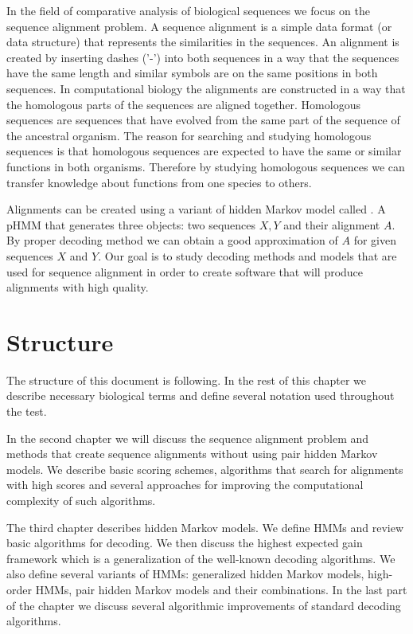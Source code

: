 In the field of comparative analysis of biological sequences we focus on the
sequence alignment problem. A sequence alignment is a simple data format (or data
structure) that represents the similarities in the sequences. An alignment is
created by inserting dashes ('-') into both sequences in a way that the
sequences have the same
length and similar symbols are on the same positions in both sequences. In
computational biology the alignments are constructed in a way that the
homologous parts of the sequences are aligned together. Homologous sequences are sequences that have evolved
from the same part of the sequence of the ancestral organism.
The reason for searching and studying homologous sequences is that homologous
sequences are expected to have the same or similar functions in both organisms.
Therefore by studying homologous sequences we can transfer knowledge about
functions from one species to others.

Alignments can be created using a variant of hidden Markov model called
. A pHMM  that generates three
objects: two sequences $X,Y$ and their alignment $A$.  By proper decoding method
we can obtain a good approximation of $A$ for given sequences $X$ and $Y$. Our
goal is to study decoding methods and models that are used for sequence
alignment in order to create software that will produce alignments with high
quality.

\section{Structure}

The structure of this document is following. In the rest of this chapter we describe
necessary biological terms and define several
notation used throughout the test.

In the second chapter we will discuss the sequence alignment problem and methods
that create sequence alignments without using pair hidden Markov
models. We describe basic scoring schemes, algorithms that search for alignments
with high scores and several approaches for improving the computational
complexity of such algorithms.

The third chapter describes hidden Markov models. We define HMMs and review basic
algorithms for decoding. We then discuss the highest expected gain
framework which is a generalization of the well-known decoding algorithms. 
We also define several variants of HMMs: generalized hidden Markov models, high-order
HMMs, pair hidden Markov models and their combinations. In the last part of the chapter we
discuss several algorithmic improvements of standard decoding algorithms.

